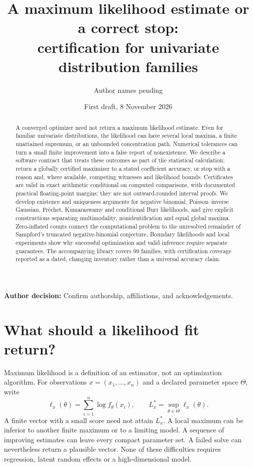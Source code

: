 \documentclass[12pt]{article}
\title{A maximum likelihood estimate or a correct stop:\\certification for univariate distribution families}
\author{Author names pending}
\date{First draft, 8 November 2026}
\theoremstyle{definition}
\theoremstyle{remark}
\newcommand{\todo}[1]{\par\smallskip\noindent\textcolor{red!65!black}{\textbf{Author decision:} #1}\par\smallskip}
\begin{document}
\maketitle
\todo{Confirm authorship, affiliations, and acknowledgements.}
\begin{abstract}
A converged optimizer need not return a maximum likelihood estimate. Even for
familiar univariate distributions, the likelihood can have several local
maxima, a finite unattained supremum, or an unbounded concentration path.
Numerical tolerances can turn a small finite improvement into a false report
of nonexistence. We describe a software contract that treats these outcomes
as part of the statistical calculation: return a globally certified maximizer
to a stated coefficient accuracy, or stop with a reason and, where available,
competing witnesses and likelihood bounds. Certificates are valid in exact
arithmetic conditional on computed comparisons, with documented practical
floating-point margins; they are not outward-rounded interval proofs.
We develop existence and uniqueness arguments for negative binomial,
Poisson--inverse Gaussian, Fr\'echet, Kumaraswamy and conditional Burr
likelihoods, and give explicit constructions separating multimodality,
nonidentification and equal global maxima. Zero-inflated counts connect the
computational problem to the unresolved remainder of Sampford's truncated
negative-binomial conjecture. Boundary likelihoods and local experiments show
why successful optimization and valid inference require separate guarantees.
The accompanying library covers 99 families, with certification coverage
reported as a dated, changing inventory rather than a universal accuracy claim.
\end{abstract}

\section{What should a likelihood fit return?}\label{sec:intro}
Maximum likelihood is a definition of an estimator, not an optimization
algorithm. For observations $x=(x_1,\ldots,x_n)$ and a declared parameter
space $\Theta$, write
\[
 \ell_x(\theta)=\sum_{i=1}^n\log f_\theta(x_i),\qquad
 L_x^*=\sup_{\theta\in\Theta}\ell_x(\theta).
\]
A finite vector with a small score need not attain $L_x^*$. A local maximum
can be inferior to another finite maximum or to a limiting model. A sequence
of improving estimates can leave every compact parameter set. A failed solve
can nevertheless return a plausible vector. None of these difficulties
requires regression, latent random effects or a high-dimensional model.
\end{document}
